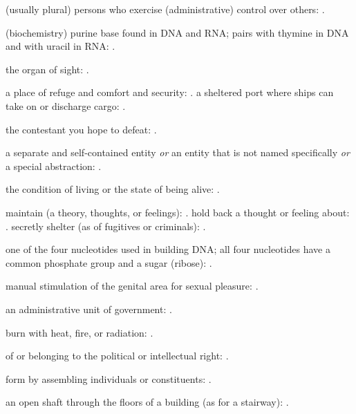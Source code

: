   (usually plural) persons who exercise (administrative) control over others: .

  (biochemistry) purine base found in DNA and RNA; pairs with thymine in DNA and with uracil in RNA:   .

  the organ of sight:   .

  a place of refuge and comfort and security:   . a sheltered port where ships can take on or discharge cargo:   .

  the contestant you hope to defeat:   .

  a separate and self-contained entity \textit{or} an entity that is not named specifically \textit{or} a special abstraction: .

  the condition of living or the state of being alive:   .

  maintain (a theory, thoughts, or feelings):   . hold back a thought or feeling about:   . secretly shelter (as of fugitives or criminals):   .

  one of the four nucleotides used in building DNA; all four nucleotides have a common phosphate group and a sugar (ribose):   .

  manual stimulation of the genital area for sexual pleasure: .

  an administrative unit of government:   .

  burn with heat, fire, or radiation: .

  of or belonging to the political or intellectual right: .

  form by assembling individuals or constituents: .

  an open shaft through the floors of a building (as for a stairway): .

